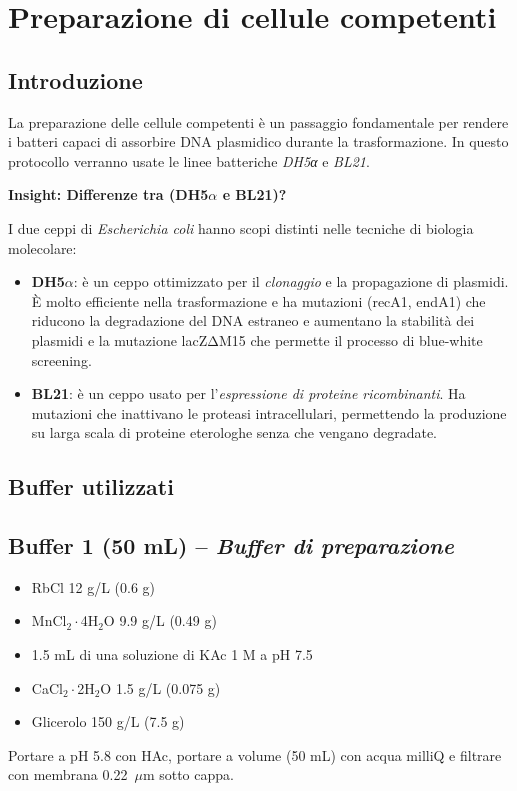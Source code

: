 \section {Preparazione di cellule competenti}

\subsection{Introduzione}

La preparazione delle cellule competenti è un passaggio fondamentale per rendere i batteri capaci di assorbire DNA plasmidico durante la trasformazione. In questo protocollo verranno usate le linee batteriche \textit{DH5α} e \textit{BL21}.

\begin{insightBox}
  \textbf{Insight: Differenze tra (DH5$\alpha$ e BL21)?}

  I due ceppi di \textit{Escherichia coli} hanno scopi distinti nelle tecniche di biologia molecolare:
  
  \begin{itemize}\footnotesize
    \item \textbf{DH5$\alpha$}: è un ceppo ottimizzato per il \textit{clonaggio} e la propagazione di plasmidi. È molto efficiente nella trasformazione e ha mutazioni (recA1, endA1) che riducono la degradazione del DNA estraneo e aumentano la stabilità dei plasmidi e la mutazione lacZΔM15 che permette il processo di blue-white screening.
    \item \textbf{BL21}: è un ceppo usato per l’\textit{espressione di proteine ricombinanti}. Ha mutazioni che inattivano le proteasi intracellulari, permettendo la produzione su larga scala di proteine eterologhe senza che vengano degradate.
  \end{itemize}
\end{insightBox}


\subsection{Buffer utilizzati}

\subsection*{Buffer 1 (50 mL) – \textit{Buffer di preparazione}}
\begin{itemize}\footnotesize
  \item RbCl 12 g/L (0.6 g)
  \item MnCl$_2\cdot$4H$_2$O 9.9 g/L (0.49 g)
  \item 1.5 mL di una soluzione di KAc 1 M a pH 7.5
  \item CaCl$_2\cdot$2H$_2$O 1.5 g/L (0.075 g)
  \item Glicerolo 150 g/L (7.5 g)
\end{itemize}
Portare a pH 5.8 con HAc, portare a volume (50 mL) con acqua milliQ e filtrare con membrana 0.22~$\mu$m sotto cappa.

